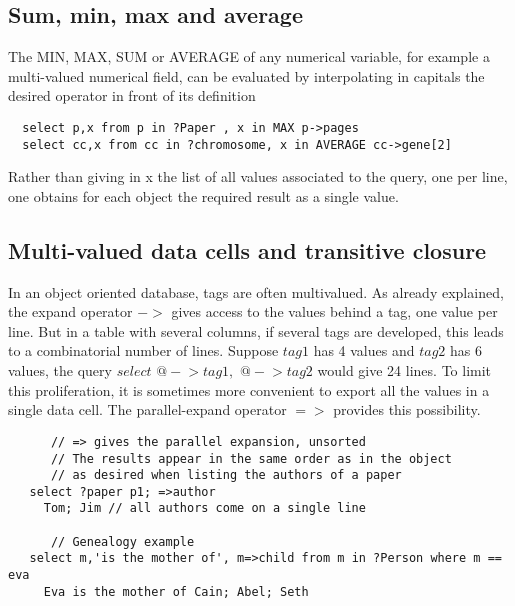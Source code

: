 \documentclass[11pt]{article}
\newcommand{\BL}{\begin{lstlisting}}
\begin{document}
%%%%%%%%%%%%%%%%%%%%%%%%%%%%%%%%%%%%%%%%%%%%%%%%%%%%%%%%%%%%%%%%
% SECTION
%%%%%%%%%%%%%%%%%%%%%%%%%%%%%%%%%%%%%%%%%%%%%%%%%%%%%%%%%%%%%%%%
\subsection{Sum, min, max and average}

The MIN, MAX, SUM or AVERAGE of any numerical variable,
for example a multi-valued numerical field, can be evaluated
by interpolating in capitals the desired operator in front of its definition
\BL
  select p,x from p in ?Paper , x in MAX p->pages
  select cc,x from cc in ?chromosome, x in AVERAGE cc->gene[2]
\end{lstlisting}
Rather than giving in x the list of all values associated to the query, one per line,
one obtains for each object the required result as a single value.


\subsection{Multi-valued data cells and transitive closure}

In an object oriented database, tags are often multivalued.
As already explained, the expand operator $->$ gives access to
the values behind a tag, one value per line. But in a table with several
columns, if several tags are developed, this leads to
a combinatorial number of lines. Suppose $tag1$ has 4 values and $tag2$ 
has 6 values,
the query $select$ $@-$$>tag1,$ $@-$$>tag2$ would give 24 lines.
To limit this proliferation, it is sometimes more convenient
to export all the values in a single data cell. The
parallel-expand operator $=>$ provides this possibility.
\BL
      // => gives the parallel expansion, unsorted
      // The results appear in the same order as in the object
      // as desired when listing the authors of a paper
   select ?paper p1; =>author
     Tom; Jim // all authors come on a single line

      // Genealogy example
   select m,'is the mother of', m=>child from m in ?Person where m == eva 
     Eva is the mother of Cain; Abel; Seth
\end{lstlisting}
\end{document}
